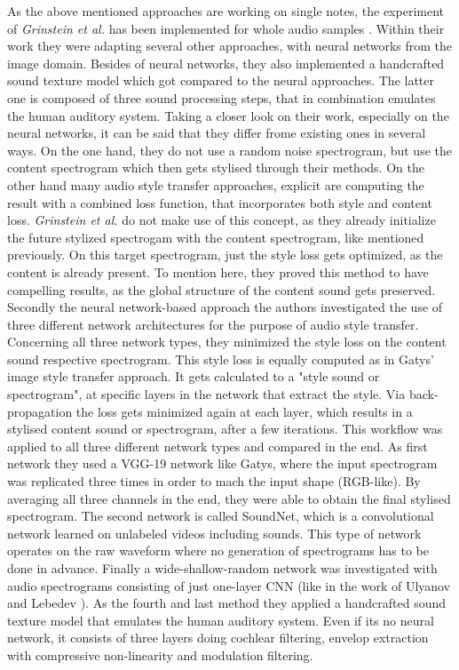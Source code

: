 As the above mentioned approaches are working on single notes, the experiment of \textit{Grinstein et al.} has been implemented for whole audio samples \cite{Grinstein2018}. Within their work they were adapting several other approaches, with neural networks from the image domain. Besides of neural networks, they also implemented a handcrafted sound texture model which got compared to the neural approaches. The latter one is composed of three sound processing steps, that in combination emulates the human auditory system. Taking a closer look on their work, especially on the neural networks, it can be said that they differ frome existing ones in several ways. On the one hand, they do not use a random noise spectrogram, but use the content spectrogram which then gets stylised through their methods. On the other hand many audio style transfer approaches, explicit are computing the result with a combined loss function, that incorporates both style and content loss. \textit{Grinstein et al.} do not make use of this concept, as they already initialize the future stylized spectrogam with the content spectrogram, like mentioned previously. On this target spectrogram, just the style loss gets optimized, as the content is already present. To mention here, they proved this method to have compelling results, as the global structure of the content sound gets preserved.\\
Secondly the neural network-based approach the authors investigated the use of three different network architectures for the purpose of audio style transfer. Concerning all three network types, they minimized the style loss on the content sound respective spectrogram. This style loss is equally computed as in Gatys' image style transfer approach. It gets calculated to a "style sound or spectrogram", at specific layers in the network that extract the style. Via back-propagation the loss gets minimized again at each layer, which results in a stylised content sound or spectrogram, after a few iterations. This workflow was applied to all three different network types and compared in the end. As first network they used a VGG-19 network like Gatys, where the input spectrogram was replicated three times in order to mach the input shape (RGB-like). By averaging all three channels in the end, they were able to obtain the final stylised spectrogram. The second network is called SoundNet, which is a convolutional network learned on unlabeled videos including sounds. This type of network operates on the raw waveform where no generation of spectrograms has to be done in advance. Finally a wide-shallow-random network was investigated with audio spectrograms consisting of just one-layer CNN (like in the work of Ulyanov and Lebedev \cite{ulyanov2016audio}). As the fourth and last method they applied a handcrafted sound texture model that emulates the human auditory system. Even if its no neural network, it consists of three layers doing cochlear filtering, envelop extraction with compressive non-linearity and modulation filtering.\\
